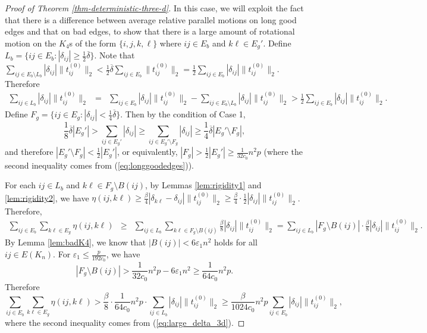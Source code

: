 \begin{proof}[Proof of Theorem \ref{thm-deterministic-three-d}]
In this case, we will exploit the fact that there is a difference between average
relative parallel motions on long good edges and that on bad edges, to show that there is
a large amount of rotational motion on the $K_{4}$s of the form $\{i,j,k,\ell\}$
where $ij\in E_{b}$ and $k\ell\in E_{g}'$. Define $L_{b}=\{ij\in E_{b}:|\delta_{ij}|\ge\frac{1}{2}\overline{\delta}\}.$
Note that $\sum_{ij\in E_{b}\setminus L_{b}}|\delta_{ij}|\|t_{ij}^{(0)}\|_2<\frac{1}{2}\overline{\delta}\sum_{ij\in E_{b}}\|t_{ij}^{(0)}\|_2=\frac{1}{2}\sum_{ij\in E_{b}}|\delta_{ij}|\|t_{ij}^{(0)}\|_2$.
Therefore 
\begin{eqnarray}
\sum_{ij\in L_{b}}|\delta_{ij}|\|t_{ij}^{(0)}\|_2 & = & \sum_{ij\in E_{b}}|\delta_{ij}|\|t_{ij}^{(0)}\|_2-\sum_{ij\in E_{b}\setminus L_{b}}|\delta_{ij}|\|t_{ij}^{(0)}\|_2>\frac{1}{2}\sum_{ij\in E_{b}}|\delta_{ij}|\|t_{ij}^{(0)}\|_2.\label{eq:large_delta_3d}
\end{eqnarray}
Define $F_{g}=\{ij\in E_{g}:|\delta_{ij}|<\frac{1}{4}\overline{\delta}\}$.
Then by the condition of Case 1,
\[
\frac{1}{8}\overline{\delta}|E_{g}'|>\sum_{ij\in E_{g}'}|\delta_{ij}|\ge\sum_{ij\in E_{g}'\setminus F_{g}}|\delta_{ij}|\ge\frac{1}{4}\overline{\delta}|E_{g}'\setminus F_{g}|,
\]
and therefore $|E_{g}'\setminus F_{g}|<\frac{1}{2}|E_{g}'|$, or equivalently,
$|F_{g}|>\frac{1}{2}|E_{g}'|\ge\frac{1}{32c_{0}}n^{2}p$ (where the
second inequality comes from (\ref{eq:longgoodedges})).

For each $ij\in L_{b}$ and $k\ell\in F_{g}\setminus B(ij)$, by Lemmas
\ref{lem:rigidity1} and \ref{lem:rigidity2}, we have $\eta(ij,k\ell)\ge\frac{\beta}{4}|\delta_{k\ell}-\delta_{ij}|\|t_{ij}^{(0)}\|_2\ge\frac{\beta}{4}\cdot\frac{1}{2}|\delta_{ij}|\|t_{ij}^{(0)}\|_2$.
Therefore, 
\begin{eqnarray*}
\sum_{ij\in E_{b}}\sum_{k\ell\in E_{g}}\eta(ij,k\ell) & \ge & \sum_{ij\in L_{b}}\sum_{k\ell\in F_{g}\setminus B(ij)}\frac{\beta}{8}|\delta_{ij}|\|t_{ij}^{(0)}\|_2=\sum_{ij\in L_{b}}|F_{g}\setminus B(ij)|\cdot\frac{\beta}{8}|\delta_{ij}|\|t_{ij}^{(0)}\|_2.
\end{eqnarray*}
By Lemma \ref{lem:badK4}, we know that $|B(ij)|<6\varepsilon_{1}n^{2}$
holds for all $ij\in E(K_{n})$. For $\varepsilon_1 \le \frac{p}{192c_0}$, we have
\[
	|F_{g}\setminus B(ij)| 
	> \frac{1}{32c_{0}}n^{2}p-6\varepsilon_{1}n^{2}
	\ge\frac{1}{64c_{0}}n^{2}p.
\]
Therefore
\[
	\sum_{ij\in E_{b}}\sum_{k\ell\in E_{g}}\eta(ij,k\ell)
	> \frac{\beta}{8}\cdot\frac{1}{64c_{0}}n^{2}p\cdot\sum_{ij\in L_{b}}|\delta_{ij}|\|t_{ij}^{(0)}\|_2\ge\frac{\beta}{1024c_{0}}n^{2}p\sum_{ij\in E_{b}}|\delta_{ij}|\|t_{ij}^{(0)}\|_2,
\]
where the second inequality comes from (\ref{eq:large_delta_3d}).


\end{proof}
